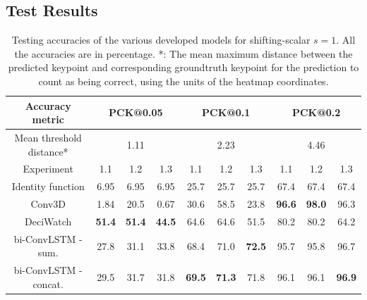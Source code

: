 \documentclass[./main.tex]{subfiles}
\begin{document}
\subsection{Test Results}
\begin{table}[htbp]
    \begin{tabular}{c||ccc|ccc|ccc}
        \hline
        Accuracy metric & \multicolumn{3}{c}{PCK@0.05} & \multicolumn{3}{c}{PCK@0.1} & \multicolumn{3}{c}{PCK@0.2} \\
        \hline
        Mean threshold distance* & \multicolumn{3}{c}{1.11} & \multicolumn{3}{c}{2.23} & \multicolumn{3}{c}{4.46} \\
        \hline
        Experiment & 1.1 & 1.2 & 1.3 & 1.1 & 1.2 & 1.3 & 1.1 & 1.2 & 1.3 \\
        \hline
        \hline
        Identity function & 6.95 & 6.95 & 6.95 & 25.7 & 25.7 & 25.7 & 67.4 & 67.4 & 67.4 \\
        Conv3D & 1.84 & 20.5 & 0.67 & 30.6 & 58.5 & 23.8 & \textbf{96.6} & \textbf{98.0} & 96.3 \\
        DeciWatch & \textbf{51.4} & \textbf{51.4} & \textbf{44.5} & 64.6 & 64.6 & 51.5 & 80.2 & 80.2 & 64.2 \\
        bi-ConvLSTM - sum. & 27.8 & 31.1 & 33.8 & 68.4 & 71.0 & \textbf{72.5} & 95.7 & 95.8 & 96.7\\
        bi-ConvLSTM - concat. & 29.5 & 31.7 & 31.8 & \textbf{69.5} & \textbf{71.3} & 71.8 & 96.1 & 96.1 & \textbf{96.9} \\
        \hline
    \end{tabular}
    \caption{Testing accuracies of the various developed models for shifting-scalar $s = 1$. All the accuracies are in percentage. *: The mean maximum distance between the predicted keypoint and corresponding groundtruth keypoint for the prediction to count as being correct, using the units of the heatmap coordinates.}
    \label{tab:pretrain_test_accs_1}
\end{table}
\end{document}
